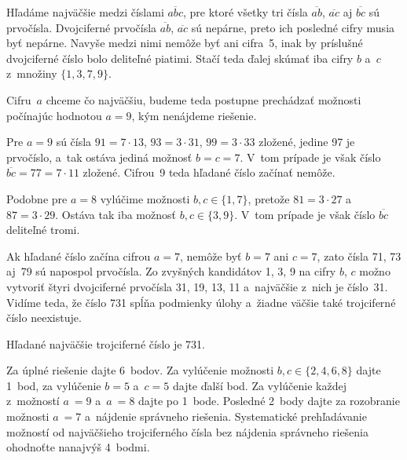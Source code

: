 {%
Hľadáme najväčšie medzi číslami $\overline{abc}$, pre ktoré všetky tri
čísla $\overline {ab}$, $\overline{ac}$ aj $\overline{bc}$ sú
prvočísla. Dvojciferné prvočísla $\overline {ab}$, $\overline{ac}$
sú nepárne, preto ich posledné
cifry musia byť nepárne. Navyše medzi nimi nemôže byť ani
cifra~5, inak by príslušné dvojciferné číslo bolo deliteľné piatimi.
Stačí teda ďalej skúmať iba cifry $b$ a~$c$ z~množiny $\{1,3,7,9\}$.

Cifru~$a$ chceme čo najväčšiu, budeme teda postupne prechádzať možnosti
počínajúc hodnotou $a=9$, kým nenájdeme riešenie.

Pre $a=9$ sú čísla $91 = 7 \cdot 13$, $93 = 3 \cdot 31$, $99 = 3 \cdot 33$
zložené, jedine 97 je prvočíslo, a~tak ostáva jediná možnosť $b = c = 7$.
V~tom prípade je však číslo $\overline {bc} = 77= 7 \cdot 11$ zložené.
Cifrou~9 teda hľadané číslo začínať nemôže.

Podobne pre $a= 8$ vylúčime
možnosti $b, c \in \{1,7\}$, pretože $81 = 3 \cdot 27$ a~$87 = 3 \cdot 29$.
Ostáva tak iba možnosť $b, c \in \{3, 9\}$. V~tom prípade je však číslo
$\overline {bc}$ deliteľné tromi.

Ak hľadané číslo začína cifrou $a=7$, nemôže byť $b=7$ ani $c=7$,
zato čísla 71, 73 aj~79 sú napospol prvočísla. Zo zvyšných kandidátov 1, 3, 9
na cifry $b$, $c$ možno vytvoriť štyri dvojciferné prvočísla
31, 19, 13, 11 a~najväčšie z~nich je
číslo~31. Vidíme teda, že číslo 731 spĺňa podmienky úlohy
a~žiadne väčšie také trojciferné číslo neexistuje.

Hľadané najväčšie trojciferné číslo je 731.


\nobreak\medskip\petit\noindent
Za úplné riešenie dajte 6~bodov.
Za vylúčenie možnosti $b, c \in \{2, 4, 6, 8\}$ dajte 1~bod, za vylúčenie
$b = 5$ a~$c = 5$ dajte ďalší bod. Za vylúčenie každej z~možností $a~= 9$
a~$a~= 8$ dajte po 1~bode. Posledné 2~body dajte za rozobranie možnosti
$a~= 7$ a~nájdenie správneho riešenia. Systematické prehľadávanie
možností od najväčšieho trojciferného čísla bez nájdenia správneho
riešenia ohodnoťte nanajvýš 4~bodmi.
\endpetit
\bigbreak
}

